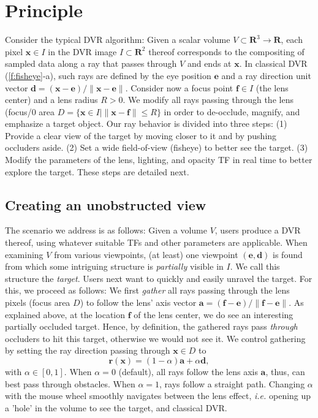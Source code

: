 \section{Principle}
\label{sec:principle}
%
%
Consider the typical DVR algorithm: Given a scalar volume $V \subset \mathbf{R}^3 \rightarrow \mathbf{R}$, each pixel $\mathbf{x} \in I$ in the DVR image $I \subset \mathbf{R}^2$ thereof corresponds to the compositing of sampled data along a ray that passes through $V$ and ends at $\mathbf{x}$. In classical DVR (\autoref{f:fisheye}-a), such rays are defined by the eye position $\mathbf{e}$ and a ray direction unit vector $\mathbf{d} = (\mathbf{x} - \mathbf{e}) / \| \mathbf{x} - \mathbf{e} \|$. Consider now a focus point $\mathbf{f} \in I$ (the lens center) and a lens radius $R > 0$. We modify all rays passing through the lens (focus/0 area $D = \{\mathbf{x} \in I | \| \mathbf{x} - \mathbf{f} \| \leq R\}$ in order to de-occlude, magnify, and emphasize a target object. Our ray behavior is divided into three steps: (1) Provide a clear view of the target by moving closer to it and by pushing occluders aside. (2) Set a wide field-of-view (fisheye) to better see the target. (3) Modify the parameters of the lens, lighting, and opacity TF in real time to better explore the target. These steps are detailed next.

\subsection{Creating an unobstructed view}
\label{sec:gathering}
%
The scenario we address is as follows: Given a volume $V$, users produce a DVR thereof, using whatever suitable TFs and other parameters are applicable. When examining $V$ from various viewpoints, (at least) one viewpoint $(\mathbf{e},\mathbf{d})$ is found from which some intriguing structure is \emph{partially} visible in $I$. We call this structure the \emph{target}. Users next want to quickly and easily unravel the target. For this, we proceed as follows: We first \emph{gather} all rays passing through the lens pixels (focus area $D$) to follow the lens' axis vector $\mathbf{a} = (\mathbf{f} - \mathbf{e}) / \| \mathbf{f} - \mathbf{e} \|$. As explained above, at the location $\mathbf{f}$ of the lens center, we do see an interesting partially occluded target. Hence, by definition, the gathered rays pass \emph{through} occluders to hit this target, otherwise we would not see it. We control gathering by setting the ray direction passing through $\mathbf{x} \in D$ to
%
\begin{equation}
\mathbf{r}(\mathbf{x}) = (1-\alpha) \mathbf{a} + \alpha \mathbf{d},
\label{eqn:gathering}
\end{equation}
%
with $\alpha \in [0,1]$. When $\alpha=0$ (default), all rays follow the lens axis $\mathbf{a}$, thus, can best pass through obstacles. When $\alpha=1$, rays follow a straight path. Changing $\alpha$ with the mouse wheel smoothly navigates between the lens effect, \emph{i.e.} opening up a 'hole' in the volume to see the target, and classical DVR.
%
